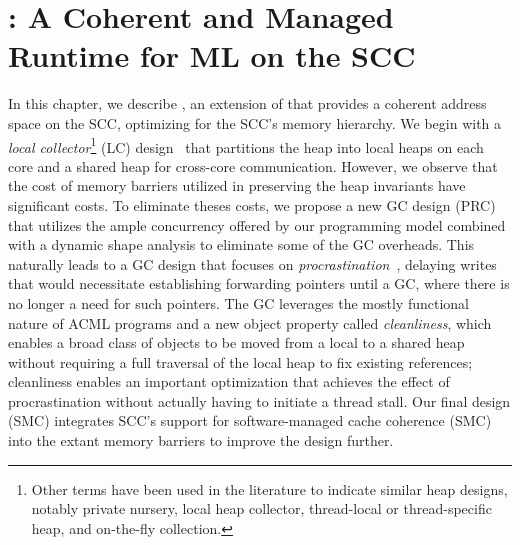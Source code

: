 \newcommand{\lc}{LC\xspace}
\newcommand{\prc}{PRC\xspace}
\newcommand{\smc}{SMC\xspace}
\newcommand{\kcore}{k_{core}}
\newcommand{\kmesh}{k_{mesh}}
\newcommand{\kram}{k_{ram}}

\lstset{
language=C,
numbers=left,
numberstyle=\footnotesize,
frame=single}




\chapter{\MMSCC: A Coherent and Managed Runtime for ML on the SCC}
\label{chap:aneris}

In this chapter, we describe \MMSCC, an extension of \MM that provides a
coherent address space on the SCC, optimizing for the SCC's memory hierarchy.
We begin with a \emph{local collector}\footnote{Other terms have been used in
the literature to indicate similar heap designs, notably private nursery, local
heap collector, thread-local or thread-specific heap, and on-the-fly
collection.} (\lc) design~\cite{Steele75, Doligez93, Steensgaard00, Anderson10,
Marlow11, Auhagen11} that partitions the heap into local heaps on each core and
a shared heap for cross-core communication. However, we observe that the cost
of memory barriers utilized in preserving the heap invariants have significant
costs. To eliminate theses costs, we propose a new GC design (\prc) that
utilizes the ample concurrency offered by our programming model combined with a
dynamic shape analysis to eliminate some of the GC overheads. This naturally
leads to a GC design that focuses on \emph{procrastination}~\cite{mmgc},
delaying writes that would necessitate establishing forwarding pointers until a
GC, where there is no longer a need for such pointers. The GC leverages the
mostly functional nature of ACML programs and a new object property called
\emph{cleanliness}, which enables a broad class of objects to be moved from a
local to a shared heap without requiring a full traversal of the local heap to
fix existing references; cleanliness enables an important optimization that
achieves the effect of procrastination without actually having to initiate a
thread stall. Our final design (\smc) integrates SCC's support for
software-managed cache coherence (SMC)~\cite{SMC} into the extant memory
barriers to improve the design further.

